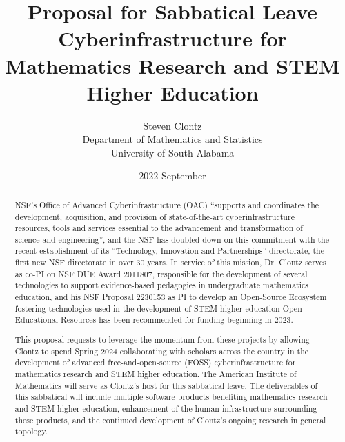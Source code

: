 \documentclass[oneside,10pt,]{article}
\title{Proposal for Sabbatical Leave\\
{\large Cyberinfrastructure for Mathematics Research and STEM Higher Education}}
\author{Steven Clontz\\
Department of Mathematics and Statistics\\
University of South Alabama
}
\date{2022 September}
\begin{document}
\raggedbottom
\hypertarget{x:article:sabbatical-proposal}{}
\maketitle
\thispagestyle{empty}
\begin{abstract}
NSF's Office of Advanced Cyberinfrastructure (OAC) ``supports and coordinates the development, acquisition, and provision of state-of-the-art cyberinfrastructure resources, tools and services essential to the advancement and transformation of science and engineering'', and the NSF has doubled-down on this commitment with the recent establishment of its ``Technology, Innovation and Partnerships'' directorate, the first new NSF directorate in over 30 years. In service of this mission, Dr. Clontz serves as co-PI on NSF DUE Award 2011807, responsible for the development of several technologies to support evidence-based pedagogies in undergraduate mathematics education, and his NSF Proposal 2230153 as PI to develop an Open-Source Ecosystem fostering technologies used in the development of STEM higher-education Open Educational Resources has been recommended for funding beginning in 2023.%
\par
This proposal requests to leverage the momentum from these projects by allowing Clontz to spend Spring 2024 collaborating with scholars across the country in the development of advanced free-and-open-source (FOSS) cyberinfrastructure for mathematics research and STEM higher education. The American Institute of Mathematics will serve as Clontz's host for this sabbatical leave. The deliverables of this sabbatical will include multiple software products benefiting mathematics research and STEM higher education, enhancement of the human infrastructure surrounding these products, and the continued development of Clontz's ongoing research in general topology.%
\end{abstract}
%
%
\typeout{************************************************}
\typeout{************************************************}
%
\end{document}
